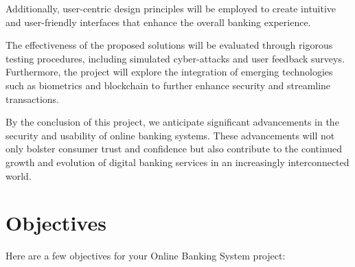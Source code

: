 \documentclass{report}
\begin{document}
Additionally, user-centric design principles will be employed to create intuitive and user-friendly 
interfaces that enhance the overall banking experience.

The effectiveness of the proposed solutions will be evaluated through rigorous testing
procedures, including simulated cyber-attacks and user feedback surveys. Furthermore, the
project will explore the integration of emerging technologies such as biometrics and
blockchain to further enhance security and streamline transactions.

By the conclusion of this project, we anticipate significant advancements in the security and
usability of online banking systems. These advancements will not only bolster consumer
trust and confidence but also contribute to the continued growth and evolution of digital
banking services in an increasingly interconnected world.

\chapter{Objectives}
Here are a few objectives for your Online Banking System project:
\end{document}
